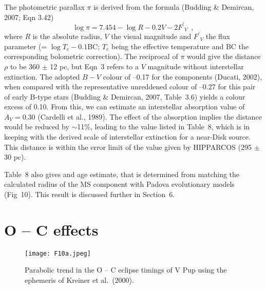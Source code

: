 \documentclass[useAMS,usenatbib]{mnras}                                                                           \usepackage[pdftex]{graphicx}
\begin{document}
The photometric parallax $\pi$ is derived from the formula (Budding \& Demircan, 2007;
Eqn 3.42)
\begin{equation}
\log \pi = 7.454 - \log R - 0.2V - 2{F^{\prime}}_V  \,\,\,  ,
\end{equation}
where $R$ is the absolute radius, $V$ the visual magnitude and
 ${F^{\prime}}_V$ the flux parameter (= $\log T_e - 0.1$BC;
 $T_e$ being the effective temperature and BC the corresponding bolometric correction).
The reciprocal of $\pi$ would give the distance $\rho$ to be 360 $\pm$ 12 pc,
but Eqn~3 refers to a $V$ magnitude without interstellar extinction.
The adopted $B - V$ colour of --0.17 for the components (Ducati, 2002), when compared with 
the representative unreddened colour of --0.27 for this pair of early B-type stars  
(Budding \& Demircan, 2007, Table~3.6) yields a colour excess of 0.10.  
From this, we can estimate an 
interstellar absorption value of $A_V = 0.30$ (Cardelli et al., 1989).
The effect of the absorption implies the distance would be reduced 
 by $\sim$11\%, leading to the value listed in Table~8, which is in keeping with the
derived scale of interstellar extinction for a near-Disk source.
This distance is within the error limit of the 
value given by HIPPARCOS (295 $\pm$ 30 pc).

Table~8 also gives and age estimate, that is determined from matching the calculated
radius of the MS component with Padova evolutionary models (Fig~10).  This
result is discussed further in Section~6.
 

 
\section{O -- C effects} 
 
 \begin{figure}
\label{fig-11}
\texttt{[image: F10a.jpeg]}\\
\caption{Parabolic trend in the O -- C eclipse timings
of V Pup using the ephemeris of Kreiner et al.\ (2000).  
}
\end{figure} 
 
\end{document}
